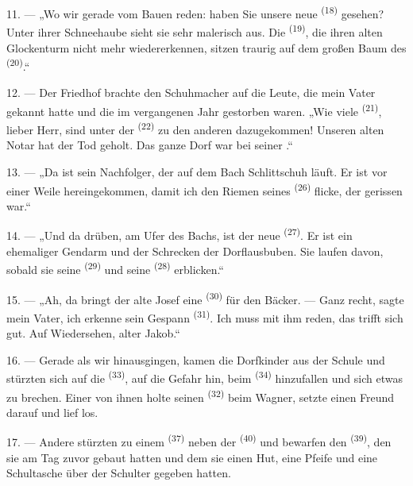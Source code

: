 11. --- „Wo wir gerade vom Bauen reden: haben Sie unsere neue 
\textsuperscript{(18)} gesehen? Unter ihrer Schneehaube sieht sie sehr malerisch aus.
Die  \textsuperscript{(19)}, die ihren alten Glockenturm nicht mehr
wiedererkennen, sitzen traurig auf dem großen Baum des 
\textsuperscript{(20)}.“

12. --- Der Friedhof brachte den Schuhmacher auf die Leute, die mein Vater gekannt
hatte und die im vergangenen Jahr gestorben waren. „Wie viele 
\textsuperscript{(21)}, lieber Herr, sind unter der 
\textsuperscript{(22)} zu den anderen dazugekommen! Unseren alten Notar hat der Tod
geholt. Das ganze Dorf war bei seiner .“

13. --- „Da ist sein Nachfolger, der auf dem Bach Schlittschuh läuft. Er ist vor
einer Weile hereingekommen, damit ich den Riemen seines 
\textsuperscript{(26)} flicke, der gerissen war.“

14. --- „Und da drüben, am Ufer des Bachs, ist der neue 
\textsuperscript{(27)}. Er ist ein ehemaliger Gendarm und der Schrecken der
Dorflausbuben. Sie laufen davon, sobald sie seine 
\textsuperscript{(29)} und seine  \textsuperscript{(28)}
erblicken.“

15. --- „Ah, da bringt der alte Josef eine 
\textsuperscript{(30)} für den Bäcker. --- Ganz recht, sagte mein Vater, ich erkenne
sein Gespann  \textsuperscript{(31)}. Ich muss mit ihm reden, das
trifft sich gut. Auf Wiedersehen, alter Jakob.“

16. --- Gerade als wir hinausgingen, kamen die Dorfkinder aus der Schule und
stürzten sich auf die  \textsuperscript{(33)}, auf die Gefahr hin,
beim  \textsuperscript{(34)} hinzufallen und sich etwas zu brechen.
Einer von ihnen holte seinen  \textsuperscript{(32)} beim Wagner,
setzte einen Freund darauf und lief los.

17. --- Andere stürzten zu einem  \textsuperscript{(37)} neben
der  \textsuperscript{(40)} und bewarfen den 
\textsuperscript{(39)}, den sie am Tag zuvor gebaut hatten und dem sie einen Hut,
eine Pfeife und eine Schultasche über der Schulter gegeben hatten.

